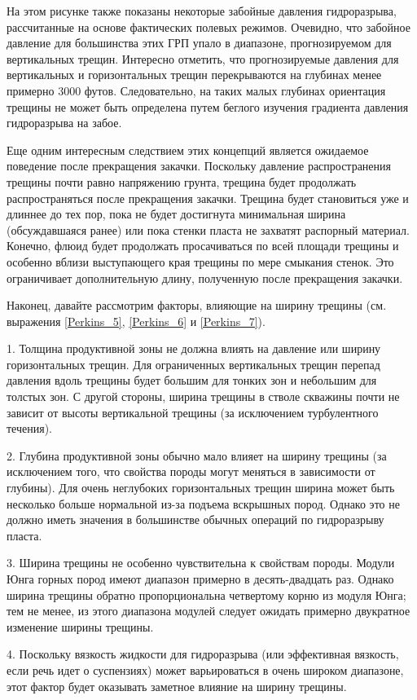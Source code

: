 \documentclass[a4paper, 12pt]{article}
\begin{document}
На этом рисунке также показаны некоторые забойные давления гидроразрыва, рассчитанные на основе фактических полевых режимов.
Очевидно, что забойное давление для большинства этих ГРП упало в диапазоне, прогнозируемом для вертикальных трещин.
Интересно отметить, что прогнозируемые давления для вертикальных и горизонтальных трещин перекрываются на глубинах менее примерно 3000 футов.
Следовательно, на таких малых глубинах ориентация трещины не может быть определена путем беглого изучения градиента давления гидроразрыва на забое.

Еще одним интересным следствием этих концепций является ожидаемое поведение после прекращения закачки.
Поскольку давление распространения трещины почти равно напряжению грунта, трещина будет продолжать распространяться после прекращения закачки.
Трещина будет становиться уже и длиннее до тех пор, пока не будет достигнута минимальная ширина (обсуждавшаяся ранее) или пока стенки пласта не захватят распорный материал.
Конечно, флюид будет продолжать просачиваться по всей площади трещины и особенно вблизи выступающего края трещины по мере смыкания стенок.
Это ограничивает дополнительную длину, полученную после прекращения закачки.

Наконец, давайте рассмотрим факторы, влияющие на ширину трещины (см. выражения \ref{Perkins_5}, \ref{Perkins_6} и \ref{Perkins_7}).

1. Толщина продуктивной зоны не должна влиять на давление или ширину горизонтальных трещин.
Для ограниченных вертикальных трещин перепад давления вдоль трещины будет большим для тонких зон и небольшим для толстых зон.
С другой стороны, ширина трещины в стволе скважины почти не зависит от высоты вертикальной трещины (за исключением турбулентного течения).

2. Глубина продуктивной зоны обычно мало влияет на ширину трещины (за исключением того, что свойства породы могут меняться в зависимости от глубины).
Для очень неглубоких горизонтальных трещин ширина может быть несколько больше нормальной из-за подъема вскрышных пород.
Однако это не должно иметь значения в большинстве обычных операций по гидроразрыву пласта.

3. Ширина трещины не особенно чувствительна к свойствам породы.
Модули Юнга горных пород имеют диапазон примерно в десять-двадцать раз.
Однако ширина трещины обратно пропорциональна четвертому корню из модуля Юнга;
тем не менее, из этого диапазона модулей следует ожидать примерно двукратное изменение ширины трещины.

4. Поскольку вязкость жидкости для гидроразрыва (или эффективная вязкость, если речь идет о суспензиях) может варьироваться в очень широком диапазоне, этот фактор будет оказывать заметное влияние на ширину трещины.
\end{document}
